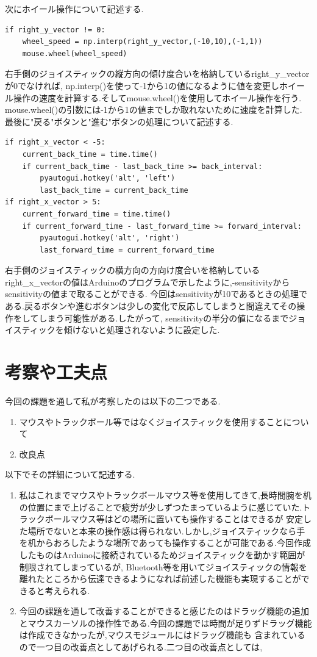 \documentclass[dvipdfmx]{jarticle}
\begin{document}
次にホイール操作について記述する.
\begin{lstlisting}
if right_y_vector != 0:
    wheel_speed = np.interp(right_y_vector,(-10,10),(-1,1))
    mouse.wheel(wheel_speed)
\end{lstlisting}
右手側のジョイスティックの縦方向の傾け度合いを格納しているright\_y\_vectorが0でなければ,
np.interp()を使って-1から1の値になるように値を変更しホイール操作の速度を計算する.そしてmouse.wheel()を使用してホイール操作を行う.
mouse.wheel()の引数には-1から1の値までしか取れないために速度を計算した.\\
最後に"戻る"ボタンと"進む"ボタンの処理について記述する.
\begin{lstlisting}
if right_x_vector < -5:
    current_back_time = time.time()
    if current_back_time - last_back_time >= back_interval:
        pyautogui.hotkey('alt', 'left')
        last_back_time = current_back_time
if right_x_vector > 5:
    current_forward_time = time.time()
    if current_forward_time - last_forward_time >= forward_interval:
        pyautogui.hotkey('alt', 'right')
        last_forward_time = current_forward_time
\end{lstlisting}
右手側のジョイスティックの横方向の方向け度合いを格納しているright\_x\_vectorの値はArduinoのプログラムで示したように,-sensitivityからsensitivityの値まで取ることができる.
今回はsensitivityが10であるときの処理である.戻るボタンや進むボタンは少しの変化で反応してしまうと間違えてその操作をしてしまう可能性がある.したがって,
sensitivityの半分の値になるまでジョイスティックを傾けないと処理されないように設定した.
\section{考察や工夫点}
今回の課題を通して私が考察したのは以下の二つである.
\begin{enumerate}
    \item マウスやトラックボール等ではなくジョイスティックを使用することについて
    \item 改良点
\end{enumerate}
以下でその詳細について記述する.
\begin{enumerate}
    \item 私はこれまでマウスやトラックボールマウス等を使用してきて,長時間腕を机の位置にまで上げることで疲労が少しずつたまっているように感じていた.トラックボールマウス等はどの場所に置いても操作することはできるが
    安定した場所でないと本来の操作感は得られない.しかし,ジョイスティックなら手を机からおろしたような場所であっても操作することが可能である.今回作成したものはArduinoに接続されているためジョイスティックを動かす範囲が制限されてしまっているが,
    Bluetooth等を用いてジョイスティックの情報を離れたところから伝達できるようになれば前述した機能も実現することができると考えられる.
    \item 今回の課題を通して改善することができると感じたのはドラッグ機能の追加とマウスカーソルの操作性である.今回の課題では時間が足りずドラッグ機能は作成できなかったが,マウスモジュールにはドラッグ機能も
    含まれている\cite{5}ので一つ目の改善点としてあげられる.二つ目の改善点としては,
\end{enumerate}
\end{document}

